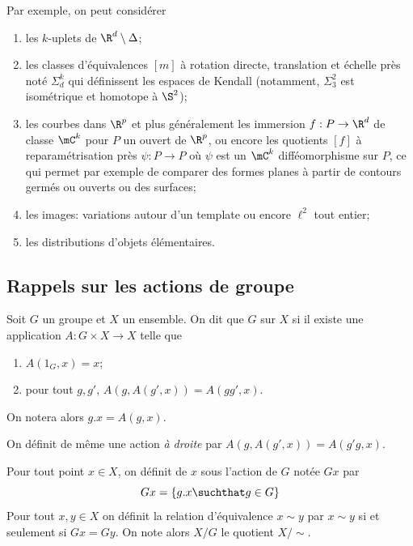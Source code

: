 Par exemple, on peut considérer
\begin{enumerate}
	\item les $k$-uplets de $\R^{d}\setminus \Delta$;
	\item les classes d'équivalences $[m]$ à rotation directe, translation et échelle près noté
	      $\Sigma_{d}^{k}$ qui définissent les espaces de Kendall (notamment, $\Sigma_{3}^{2}$ est
	      isométrique et homotope à $\S^{2}$);
	\item les courbes dans $\R^{p}$ et plus généralement les immersion $f: P \to \R^{d}$ de classe $\mC^{k}$
	      pour $P$ un ouvert de $\R^{p}$, ou encore les quotients $[f]$ à reparamétrisation près
	      $\psi: P \to P$ où $\psi$ est un $\mC^{k}$ difféomorphisme sur $P$, ce qui permet par exemple de
	      comparer des formes planes à partir de contours germés ou ouverts ou des surfaces;
	\item les images: variations autour d'un template ou encore $\ell^{2}$ tout entier;
	\item les distributions d'objets élémentaires.
\end{enumerate}

\subsection{Rappels sur les actions de groupe}
\begin{definition}
	Soit $G$ un groupe et $X$ un ensemble. On dit que $G$  sur $X$ si il existe une application
	$A: G \times X \to X$ telle que
	\begin{enumerate}
		\item $A(1_{G}, x) = x$;
		\item pour tout $g, g'$, $A(g, A(g', x)) = A(gg', x)$.
	\end{enumerate}
	On notera alors $g.x = A(g, x)$.
\end{definition}

On définit de même une action \textit{à droite} par $A(g, A(g', x)) = A(g'g, x)$.

\begin{definition}
	Pour tout point $x \in X$, on définit  de $x$ sous l'action de $G$ notée $Gx$ par
	\begin{equation*}
		Gx = \left\{g.x \suchthat g \in G\right\}
	\end{equation*}
	Pour tout $x, y \in X$ on définit la relation d'équivalence $x \sim y$ par $x \sim y$ si et seulement si
	$Gx = Gy$. On note alors $X / G$ le quotient $X / \sim$.
\end{definition}

